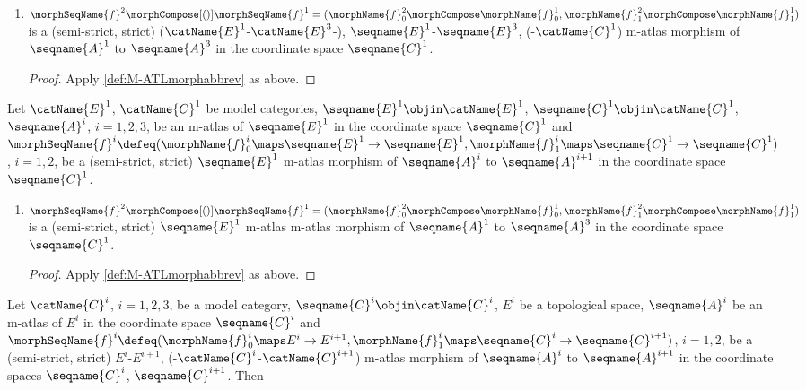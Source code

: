 \documentclass{article}
\begin{document}
\begin{corollary}
\begin{enumerate}[resume]
\item
$
  \morphSeqName{f}^2 \morphCompose[()] \morphSeqName{f}^1 =
    (
      \morphName{f}^2_0 \morphCompose \morphName{f}^1_0,
      \morphName{f}^2_1 \morphCompose \morphName{f}^1_1
    )
$
is a (semi-strict, strict)
\nobreaks
 {
   {($\catName{E}^1$-$\catName{E}^3$-)},
   {$\seqname{E}^1$-$\seqname{E}^3$},
   {(-$\catName{C}^1$)}
  }
m-atlas morphism of
$\seqname{A}^1$ to $\seqname{A}^3$ in the coordinate space
$\seqname{C}^1$.

\begin{proof}
Apply \cref{def:M-ATLmorphabbrev} as above.
\end{proof}
\end{enumerate}

Let $\catName{E}^1$, $\catName{C}^1$ be model categories,
$\seqname{E}^1 \objin \catName{E}^1$,
$\seqname{C}^1 \objin \catName{C}^1$, $\seqname{A}^i$, $i=1,2,3$, be an
m-atlas of $\seqname{E}^1$ in the coordinate space $\seqname{C}^1$ and
$
  \morphSeqName{f}^i \defeq
    (
      \morphName{f}^i_0 \maps \seqname{E}^1 \to \seqname{E}^1,
      \morphName{f}^i_1 \maps \seqname{C}^1 \to \seqname{C}^1
    )
$, $i=1,2$,
be a (semi-strict, strict) $\seqname{E}^1$ m-atlas morphism of
$\seqname{A}^i$ to $\seqname{A}^{i+1}$ in the coordinate space
$\seqname{C}^1$.

\begin{enumerate}[resume]
\item
$
  \morphSeqName{f}^2 \morphCompose[()] \morphSeqName{f}^1 =
    (
      \morphName{f}^2_0 \morphCompose \morphName{f}^1_0,
      \morphName{f}^2_1 \morphCompose \morphName{f}^1_1
    )
$
is a (semi-strict, strict) $\seqname{E}^1$ m-atlas m-atlas morphism
of $\seqname{A}^1$ to $\seqname{A}^3$ in the coordinate space
$\seqname{C}^1$.

\begin{proof}
Apply \cref{def:M-ATLmorphabbrev} as above.
\end{proof}
\end{enumerate}

Let $\catName{C}^i$, $i=1,2,3$, be a model category,
$\seqname{C}^i \objin \catName{C}^i$, $E^i$ be a topological space,
$\seqname{A}^i$ be an m-atlas of $E^i$ in the coordinate space
$\seqname{C}^i$ and
\nobreaks
  {{
    $
      \morphSeqName{f}^i \defeq
        (
          \morphName{f}^i_0 \maps E^i \to E^{i+1},
          \morphName{f}^i_1 \maps \seqname{C}^i \to \seqname{C}^{i+1}
        )
    $,
  }}
$i=1,2$,
be a (semi-strict, strict)
\nobreaks
 {
    {$E^i$-$E^{i+1}$},
    {(-$\catName{C}^i$-$\catName{C}^{i+1}$)}
  }
m-atlas morphism of $\seqname{A}^i$ to $\seqname{A}^{i+1}$ in the
coordinate spaces $\seqname{C}^i$, $\seqname{C}^{i+1}$. Then


\end{corollary}
\end{document}
